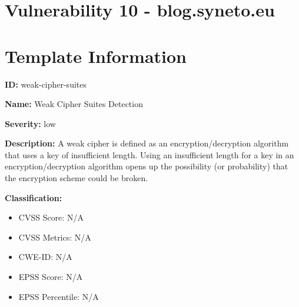 \section*{Vulnerability 10 - blog.syneto.eu}

\section*{Template Information}
\textbf{ID:} weak-cipher-suites

\textbf{Name:} Weak Cipher Suites Detection

\textbf{Severity:} low

\textbf{Description:} A weak cipher is defined as an encryption/decryption algorithm that uses a key of insufficient length. Using an insufficient length for a key in an encryption/decryption algorithm opens up the possibility (or probability) that the encryption scheme could be broken.

\textbf{Classification:}
\begin{itemize}
\item CVSS Score: N/A
\item CVSS Metrics: N/A
\item CWE-ID: N/A
\item EPSS Score: N/A
\item EPSS Percentile: N/A
\end{itemize}



